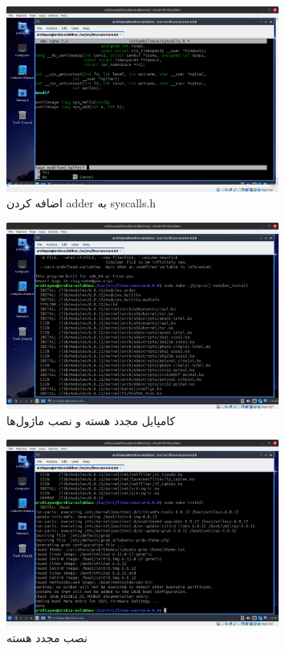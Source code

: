 \documentclass[12pt]{article}
\begin{document}
\begin{itemize}
        \begin{figure}[H]
		\centering
		\includegraphics[width=0.8\textwidth]{report2-resources/39.png}
		\caption{اضافه کردن \textenglish{adder} به \textenglish{syscalls.h}}
	\end{figure}

        \begin{figure}[H]
		\centering
		\includegraphics[width=0.8\textwidth]{report2-resources/41.png}
		\caption{کامپایل مجدد هسته و نصب ماژول‌ها}
	\end{figure}

        \begin{figure}[H]
		\centering
		\includegraphics[width=0.8\textwidth]{report2-resources/42.png}
		\caption{نصب مجدد هسته}
	\end{figure}


\end{itemize}
\end{document}
